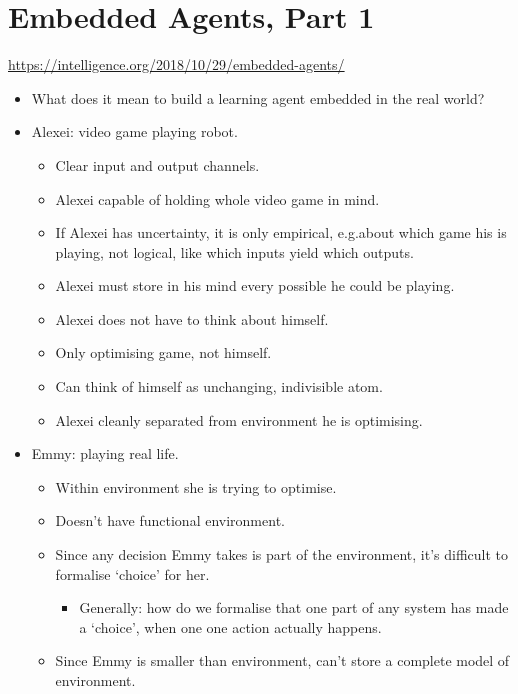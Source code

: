 \section{Embedded Agents, Part 1}

\url{https://intelligence.org/2018/10/29/embedded-agents/}

\begin{itemize}
    \item What does it mean to build a learning agent embedded in the real world?
    \item Alexei: video game playing robot.
    \begin{itemize}
        \item Clear input and output channels.
        \item Alexei capable of holding whole video game in mind.
        \item If Alexei has uncertainty, it is only empirical, e.g.\@ about which game his is playing, not logical, like which inputs yield which outputs.
        \item Alexei must store in his mind every possible he could be playing.
        \item Alexei does not have to think about himself.
        \item Only optimising game, not himself.
        \item Can think of himself as unchanging, indivisible atom.
        \item Alexei cleanly separated from environment he is optimising.
    \end{itemize}
    \item Emmy: playing real life.
    \begin{itemize}
        \item Within environment she is trying to optimise.
        \item Doesn't have functional environment.
        \item Since any decision Emmy takes is part of the environment, it's difficult to formalise `choice' for her.
        \begin{itemize}
            \item Generally: how do we formalise that one part of any system has made a `choice', when one one action actually happens.
        \end{itemize}
        \item Since Emmy is smaller than environment, can't store a complete model of environment.
        \begin{itemize}

\end{itemize}
\end{itemize}
\end{itemize}
